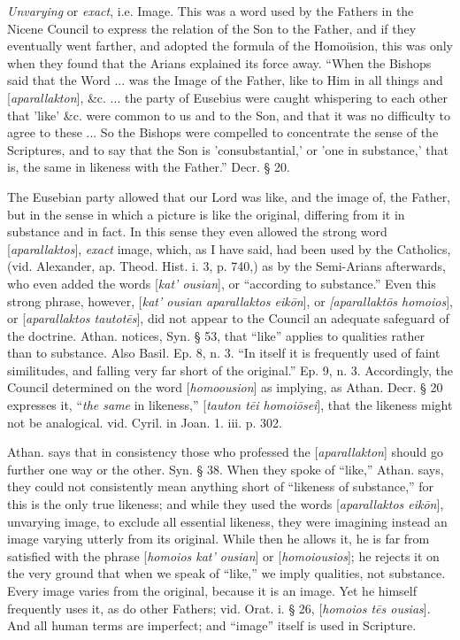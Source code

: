 
\emph{Unvarying} or \emph{exact}, i.e. Image.
This was a word used by the Fathers in the Nicene Council to express
the relation of the Son to the Father, and if they eventually went
farther, and adopted the formula of the Homoüsion, this was only when
they found that the Arians explained its force away. ``When the Bishops
said that the Word ... was the Image of the Father, like to Him in all
things and [\emph{aparallakton}], \&c. ... the party of Eusebius
were caught whispering to each other that 'like' \&c. were common
to us and to the Son, and that it was no difficulty to agree to these
... So the Bishops were compelled to concentrate the sense of the
Scriptures, and to say that the Son is 'consubstantial,' or 'one in
substance,' that is, the same in likeness with the Father.'' Decr. §
20.

The Eusebian party allowed that our Lord was
like, and the image of, the Father, but in the sense in which a
picture is like the original, differing from it in substance and in
fact. In this sense they even allowed the strong word [\emph{aparallaktos}],
\emph{exact} image, which, as I have said, had been used by the
Catholics, (vid. Alexander, ap. Theod. Hist. i. 3, p. 740,) as by the
Semi-Arians afterwards, who even added the words [\emph{kat'
ousian}], or ``according to substance.'' Even this strong
phrase, however, [\emph{kat'
ousian aparallaktos eik\={o}n}], or \emph{[aparallakt\={o}s
homoios}], or [\emph{aparallaktos tautot\={e}s}], did not appear
to the Council an adequate safeguard of the doctrine. Athan. notices,
Syn. § 53, that ``like'' applies to qualities rather than to substance.
Also Basil. Ep. 8, n. 3. ``In itself it is frequently used of faint
similitudes, and falling very far short of the original.'' Ep. 9, n. 3.
Accordingly, the Council determined on the word [\emph{homoousion}] as
implying, as Athan. Decr. § 20 expresses it, ``\emph{the same} in
likeness,'' [\emph{tauton t\={e}i homoi\={o}sei}], that the
likeness might not be analogical. vid. Cyril. in Joan. 1. iii. p. 302.

Athan. says that in consistency those who
professed the [\emph{aparallakton}] should go further one way or the
other. Syn. § 38. When they spoke of ``like,'' Athan. says, they could
not consistently mean anything short of ``likeness of substance,'' for
this is the only true likeness; and while they used the words [\emph{aparallaktos
eik\={o}n}], unvarying image, to exclude all essential likeness,
they were imagining instead an image varying utterly from its
original. While then he allows it, he is far from satisfied with the
phrase [\emph{homoios kat'
ousian}] or [\emph{homoiousios}]; he rejects it on the very
ground that when we speak of ``like,'' we imply qualities, not
substance. Every image varies from the original, because it is an
image. Yet he himself frequently uses it, as do other Fathers; vid.
Orat. i. § 26, [\emph{homoios t\={e}s ousias}]. And all human
terms are imperfect; and ``image'' itself is used in Scripture.

